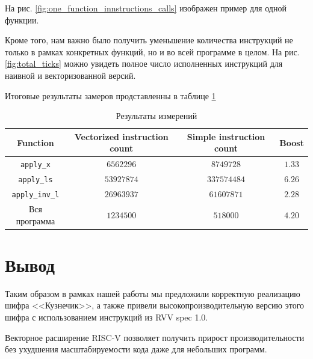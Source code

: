 \documentclass[a4paper, 12pt]{article}
\begin{document}
    На рис. \ref{fig:one_function_innstructions_calls} изображен пример для одной функции.

    Кроме того, нам важно было получить уменьшение количества инструкций не только в рамках 
    конкретных функций, но и во всей программе в целом. На рис. \ref{fig:total_ticks} можно 
    увидеть полное число исполненных инструкций для наивной и 
    векторизованной версий.

    Итоговые результаты замеров продставленны в таблице \ref{tab:results}

    \begin{table}[]
    \begin{center}
    \begin{tabular}{|c|c|c|c|}
    \hline
    \textbf{Function} & Vectorized instruction count & Simple instruction count & Boost \\ \hline
    \texttt{apply\_x}          & $6562296$                      & $8749728$                  & $1.33$  \\ \hline
    \texttt{apply\_ls}         & $53927874$                     & $337574484$                & $6.26$  \\ \hline
    \texttt{apply\_inv\_l}     & $26963937$                     & $61607871$                 & $2.28$  \\ \hline
    Вся программа     & $1234500$                      & $518000$                   & $4.20$  \\ \hline
    \end{tabular}
    \end{center}
    \caption{Результаты измерений}
    \label{tab:results}
    \end{table}

    \section{Вывод}

    Таким образом в рамках нашей работы мы предложили корректную реализацию шифра 
    <<Кузнечик>>, а также привели высокопроизводительную версию этого шифра с 
    использованием инструкций из RVV spec 1.0. 
    
    Векторное расширение RISC-V позволяет получить прирост производительности без ухудшения масштабируемости кода даже для небольших программ.


    \nocite{*}
    
\end{document}
